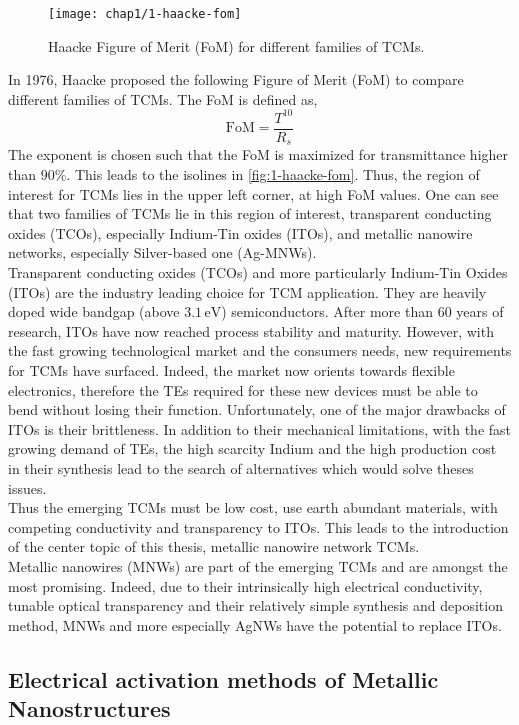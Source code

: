     \begin{figure}[H]
        \centering
        \texttt{[image: chap1/1-haacke-fom]}
        \caption{Haacke Figure of Merit (FoM) for different families of TCMs.\cite{LagrangeLangleyGiustiJimenezBrechetBellet2015}}
        \label{fig:1-haacke-fom}
    \end{figure}
    In 1976, Haacke proposed the following Figure of Merit (FoM) to compare different families of TCMs. The FoM is defined as,
    \begin{equation*}
        \text{FoM} = \frac{T^{10}}{R_s}
    \end{equation*}
    The exponent is chosen such that the FoM is maximized for transmittance higher than $90\%$. This leads to the isolines in \autoref{fig:1-haacke-fom}. Thus, the region of interest for TCMs lies in the upper left corner, at high FoM values. One can see that two families of TCMs lie in this region of interest, transparent conducting oxides (TCOs), especially Indium-Tin oxides (ITOs), and metallic nanowire networks, especially Silver-based one (Ag-MNWs).\\
    Transparent conducting oxides (TCOs) and more particularly Indium-Tin Oxides (ITOs) are the industry leading choice for TCM application. They are heavily doped wide bandgap (above $3.1\,\text{eV}$) semiconductors. After more than 60 years of research, ITOs have now reached process stability and maturity. However, with the fast growing technological market and the consumers needs, new requirements for TCMs have surfaced. Indeed, the market now orients towards flexible electronics, therefore the TEs required for these new devices must be able to bend without losing their function. Unfortunately, one of the major drawbacks of ITOs is their brittleness. In addition to their mechanical limitations, with the fast growing demand of TEs, the high scarcity Indium and the high production cost in their synthesis lead to the search of alternatives which would solve theses issues.\\
    Thus the emerging TCMs must be low cost, use earth abundant materials, with competing conductivity and transparency to ITOs. This leads to the introduction of the center topic of this thesis, metallic nanowire network TCMs.\\
    Metallic nanowires (MNWs) are part of the emerging TCMs and are amongst the most promising. Indeed, due to their intrinsically high electrical conductivity, tunable optical transparency and their relatively simple synthesis and deposition method, MNWs and more especially AgNWs have the potential to replace ITOs.\\



\subsection{Electrical activation methods of Metallic Nanostructures}
